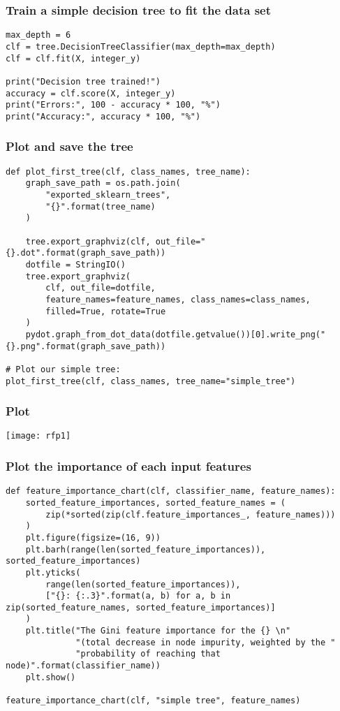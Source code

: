 \begin{frame}[fragile]\frametitle{Train a simple decision tree to fit the data set}
\begin{lstlisting}
max_depth = 6
clf = tree.DecisionTreeClassifier(max_depth=max_depth)
clf = clf.fit(X, integer_y)

print("Decision tree trained!")
accuracy = clf.score(X, integer_y)
print("Errors:", 100 - accuracy * 100, "%")
print("Accuracy:", accuracy * 100, "%")
\end{lstlisting}
\end{frame}

\begin{frame}[fragile]\frametitle{Plot and save the tree}
\begin{lstlisting}
def plot_first_tree(clf, class_names, tree_name):
    graph_save_path = os.path.join(
        "exported_sklearn_trees", 
        "{}".format(tree_name)
    )

    tree.export_graphviz(clf, out_file="{}.dot".format(graph_save_path))
    dotfile = StringIO()
    tree.export_graphviz(
        clf, out_file=dotfile,
        feature_names=feature_names, class_names=class_names,
        filled=True, rotate=True
    )
    pydot.graph_from_dot_data(dotfile.getvalue())[0].write_png("{}.png".format(graph_save_path))

# Plot our simple tree:
plot_first_tree(clf, class_names, tree_name="simple_tree")
\end{lstlisting}
\end{frame}

\begin{frame}[fragile]\frametitle{Plot}
\begin{center}
\texttt{[image: rfp1]}
\end{center}
\end{frame}

\begin{frame}[fragile]\frametitle{Plot the importance of each input features}
\begin{lstlisting}
def feature_importance_chart(clf, classifier_name, feature_names):
    sorted_feature_importances, sorted_feature_names = (
        zip(*sorted(zip(clf.feature_importances_, feature_names)))
    )
    plt.figure(figsize=(16, 9))
    plt.barh(range(len(sorted_feature_importances)), sorted_feature_importances)
    plt.yticks(
        range(len(sorted_feature_importances)),
        ["{}: {:.3}".format(a, b) for a, b in zip(sorted_feature_names, sorted_feature_importances)]
    )
    plt.title("The Gini feature importance for the {} \n"
              "(total decrease in node impurity, weighted by the "
              "probability of reaching that node)".format(classifier_name))
    plt.show()

feature_importance_chart(clf, "simple tree", feature_names)
\end{lstlisting}
\end{frame}

